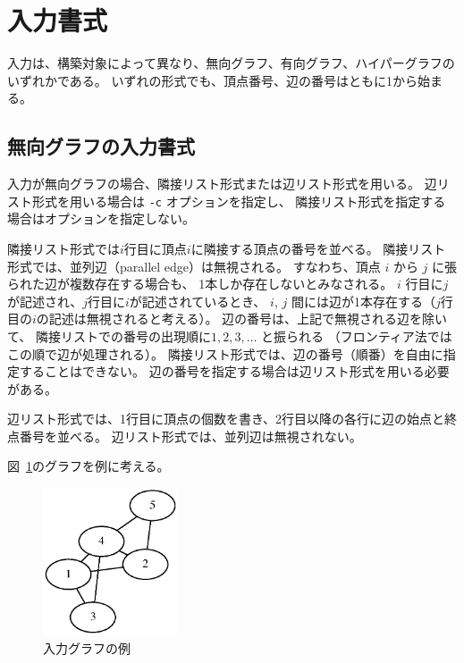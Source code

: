 \documentclass{jsarticle}
\begin{document}
\section{入力書式}

入力は、構築対象によって異なり、無向グラフ、有向グラフ、ハイパーグラフのいずれかである。
いずれの形式でも、頂点番号、辺の番号はともに1から始まる。

\subsection{無向グラフの入力書式}

入力が無向グラフの場合、隣接リスト形式または辺リスト形式を用いる。
辺リスト形式を用いる場合は \texttt{-c} オプションを指定し、
隣接リスト形式を指定する場合はオプションを指定しない。

隣接リスト形式では$i$行目に頂点$i$に隣接する頂点の番号を並べる。
隣接リスト形式では、並列辺（parallel edge）は無視される。
すなわち、頂点 $i$ から $j$ に張られた辺が複数存在する場合も、
1本しか存在しないとみなされる。
$i$ 行目に$j$が記述され、$j$行目に$i$が記述されているとき、
$i$, $j$ 間には辺が1本存在する（$j$行目の$i$の記述は無視されると考える）。
辺の番号は、上記で無視される辺を除いて、
隣接リストでの番号の出現順に$1,2,3,\ldots$ と振られる
（フロンティア法ではこの順で辺が処理される）。
隣接リスト形式では、辺の番号（順番）を自由に指定することはできない。
辺の番号を指定する場合は辺リスト形式を用いる必要がある。

辺リスト形式では、1行目に頂点の個数を書き、2行目以降の各行に辺の始点と終点番号を並べる。
辺リスト形式では、並列辺は無視されない。

図~\ref{fig:graph_example}のグラフを例に考える。

\begin{figure}[h]
  \begin{center}
    \includegraphics[width=40mm]{graph_example.eps}
  \end{center}
  \caption{入力グラフの例}
  \label{fig:graph_example}
\end{figure}
\end{document}
